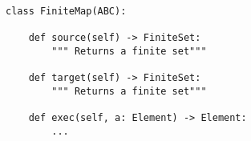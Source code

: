 \begin{verbatim}
class FiniteMap(ABC):

    def source(self) -> FiniteSet:
        """ Returns a finite set"""

    def target(self) -> FiniteSet:
        """ Returns a finite set"""

    def exec(self, a: Element) -> Element:
        ...
\end{verbatim}